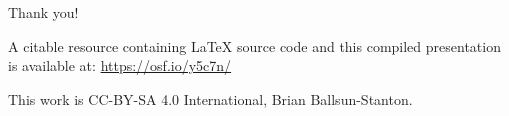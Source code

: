 \documentclass[aspectratio=1610, 11pt]{beamer} %
\begin{document}
  

  


  

  

  






  


\begin{frame}{Thank you!}


A citable resource containing \LaTeX{} source code and this compiled presentation is available at: \url{https://osf.io/y5c7n/}

This work is CC-BY-SA 4.0 International, Brian Ballsun-Stanton. 

\end{frame}
\end{document}
